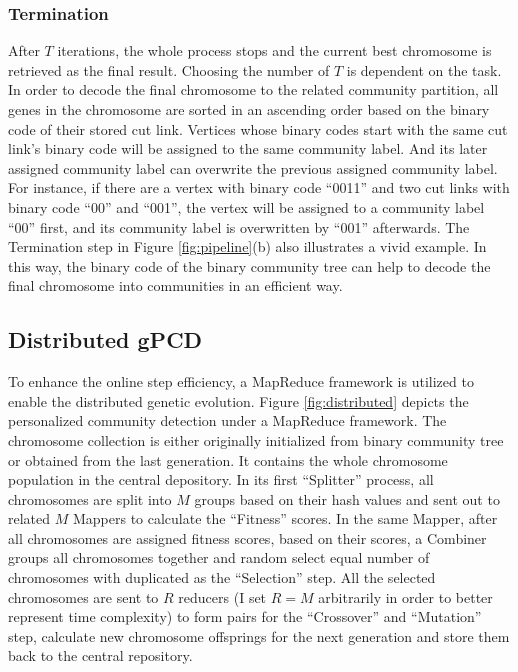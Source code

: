 \subsubsection{Termination}

After $T$ iterations, the whole process stops and the current best chromosome is retrieved as the final result. Choosing the number of $T$ is dependent on the task. In order to decode the final chromosome to the related community partition, all genes in the chromosome are sorted in an ascending order based on the binary code of their stored cut link. Vertices whose binary codes start with the same cut link's binary code will be assigned to the same community label. And its later assigned community label can overwrite the previous assigned community label. For instance, if there are a vertex with binary code ``0011'' and two cut links with binary code ``00'' and ``001'', the vertex will be assigned to a community label ``00'' first, and its community label is overwritten by ``001'' afterwards. The Termination step in Figure \ref{fig:pipeline}(b) also illustrates a vivid example. In this way, the binary code of the binary community tree can help to decode the final chromosome into communities in an efficient way. 
 

\subsection{Distributed gPCD} \label{sc:c3_distributed}
 
To enhance the online step efficiency, a MapReduce framework is utilized to enable the distributed genetic evolution. Figure \ref{fig:distributed} depicts the personalized community detection under a MapReduce framework. The chromosome collection is either originally initialized from binary community tree or obtained from the last generation. It contains the whole chromosome population in the central depository. In its first ``Splitter'' process, all chromosomes are split into $M$ groups based on their hash values and sent out to related $M$  Mappers to calculate the ``Fitness'' scores. In the same Mapper, after all chromosomes are assigned fitness scores, based on their scores, a Combiner groups all chromosomes together and random select equal number of chromosomes with duplicated as the ``Selection'' step. All the selected chromosomes are sent to $R$ reducers (I set $R = M$ arbitrarily in order to better represent time complexity) to form pairs for the ``Crossover'' and  ``Mutation'' step, calculate new chromosome offsprings for the next generation and store them back to the central repository. 
 
